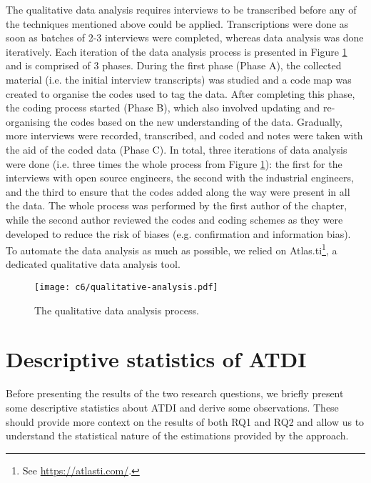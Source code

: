 The qualitative data analysis requires interviews to be transcribed before any of the techniques mentioned above could be applied.
Transcriptions were done as soon as batches of 2-3 interviews were completed, whereas data analysis was done iteratively.
Each iteration of the data analysis process is presented in Figure \ref{c6:fig:qualitative-analysis} and is comprised of 3 phases. During the first phase (Phase A), the collected material (i.e. the initial interview transcripts) was studied and a code map was created to organise the codes used to tag the data.
After completing this phase, the coding process started (Phase B), which also involved updating and re-organising the codes based on the new understanding of the data.
Gradually, more interviews were recorded, transcribed, and coded and notes were taken with the aid of the coded data (Phase C).
In total, three iterations of data analysis were done (i.e. three times the whole process from Figure \ref{c6:fig:qualitative-analysis}): the first for the interviews with open source engineers, the second with the industrial engineers, and the third to ensure that the codes added along the way were present in all the data.
The whole process was performed by the first author of the chapter, while the second author reviewed the codes and coding schemes as they were developed to reduce the risk of biases (e.g. confirmation and information bias).
To automate the data analysis as much as possible, we relied on Atlas.ti\footnote{See \url{https://atlasti.com/}.}, a dedicated qualitative data analysis tool.

\begin{figure}
    \centering
    \texttt{[image: c6/qualitative-analysis.pdf]}
    \caption{The qualitative data analysis process.}
    \label{c6:fig:qualitative-analysis}
\end{figure}

\section{Descriptive statistics of ATDI}\label{c6:sec:descriptive-statistics}
Before presenting the results of the two research questions, we briefly present some descriptive statistics about ATDI and derive some observations.
These should provide more context on the results of both RQ1 and RQ2 and allow us to understand the statistical nature of the estimations provided by the approach.

